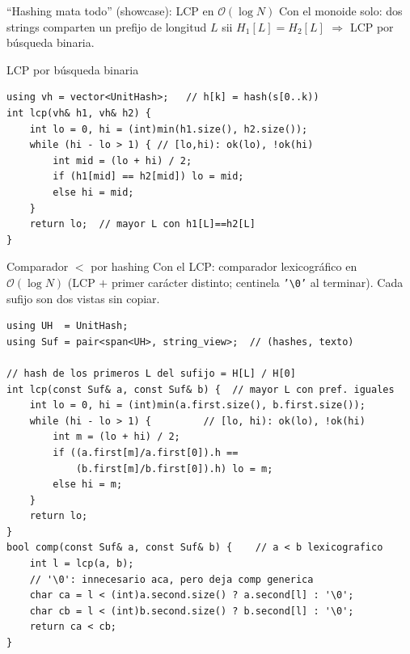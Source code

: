 \documentclass{beamer}
\begin{document}
\begin{frame}[fragile]{``Hashing mata todo'' (showcase): LCP en $\mathcal{O}(\log N)$}
Con el monoide solo: dos strings comparten un prefijo de longitud $L$ sii $H_1[L] = H_2[L]$ $\Rightarrow$ LCP por búsqueda binaria.
\begin{exampleblock}{LCP por búsqueda binaria}
\begin{verbatim}
using vh = vector<UnitHash>;   // h[k] = hash(s[0..k))
int lcp(vh& h1, vh& h2) {
    int lo = 0, hi = (int)min(h1.size(), h2.size());
    while (hi - lo > 1) { // [lo,hi): ok(lo), !ok(hi)
        int mid = (lo + hi) / 2;
        if (h1[mid] == h2[mid]) lo = mid;
        else hi = mid;
    }
    return lo;  // mayor L con h1[L]==h2[L]
}
\end{verbatim}
\end{exampleblock}
\end{frame}

\begin{frame}[fragile]{Comparador $<$ por hashing}
Con el LCP: comparador lexicográfico en $\mathcal{O}(\log N)$ (LCP $+$ primer carácter distinto; centinela \texttt{'\textbackslash 0'} al terminar). Cada sufijo son dos vistas sin copiar.
{\scriptsize
\begin{verbatim}
using UH  = UnitHash;
using Suf = pair<span<UH>, string_view>;  // (hashes, texto)

// hash de los primeros L del sufijo = H[L] / H[0]
int lcp(const Suf& a, const Suf& b) {  // mayor L con pref. iguales
    int lo = 0, hi = (int)min(a.first.size(), b.first.size());
    while (hi - lo > 1) {         // [lo, hi): ok(lo), !ok(hi)
        int m = (lo + hi) / 2;
        if ((a.first[m]/a.first[0]).h ==
            (b.first[m]/b.first[0]).h) lo = m;
        else hi = m;
    }
    return lo;
}
bool comp(const Suf& a, const Suf& b) {    // a < b lexicografico
    int l = lcp(a, b);
    // '\0': innecesario aca, pero deja comp generica
    char ca = l < (int)a.second.size() ? a.second[l] : '\0';
    char cb = l < (int)b.second.size() ? b.second[l] : '\0';
    return ca < cb;
}
\end{verbatim}
}
\end{frame}
\end{document}
